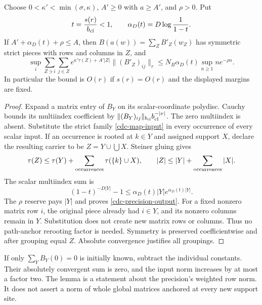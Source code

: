 \begin{lemma}
\label{cdc-precision-lemma}
Choose $0<\kappa'<\min(\sigma,\kappa)$, $A'\geq0$ with
$a\geq A'$, and $\rho>0$. Put
\begin{equation}
 t=\frac{s(r)}{b_{\rm cl}}<1,\qquad
 \alpha_D(t)=D\log\frac1{1-t}.
 \label{cdc-alpha}
\end{equation}
If $A'+\alpha_D(t)+\rho\leq A$, then
$B(a(w))=\sum_Z B'_Z(w_Z)$ has symmetric strict pieces with
rows and columns in $Z$, and
\begin{equation}
 \sup_i\sum_{Z\ni i}\sum_{j\in Z}
 e^{\kappa'\tau(Z)+A'|Z|}\|(B'_Z)_{ij}\|_r
 \leq N_B\alpha_D(t)
                   \sup_{n\geq1}n e^{-\rho n}.
 \label{cdc-precision-output}
\end{equation}
In particular the bound is $O(r)$ if $s(r)=O(r)$ and the
displayed margins are fixed.
\end{lemma}
\begin{proof}
Expand a matrix entry of $B_Y$ on its scalar-coordinate polydisc.
Cauchy bounds its multiindex coefficient by
$\|(B_Y)_{ij}\|_{b_{\rm cl}}b_{\rm cl}^{-|\nu|}$.
The zero multiindex is absent. Substitute the strict family
\eqref{cdc-map-input} in every occurrence of every scalar input.
If an occurrence is rooted at $k\in Y$ and assigned support $X$,
declare the resulting carrier to be
$Z=Y\cup\bigcup X$. Steiner gluing gives
\begin{equation}
 \tau(Z)\leq\tau(Y)+\sum_{\rm occurrences}
                            \tau(\{k\}\cup X),\qquad
 |Z|\leq|Y|+\sum_{\rm occurrences}|X|.
 \label{cdc-precision-gluing}
\end{equation}
The scalar multiindex sum is
\begin{equation}
 (1-t)^{-D|Y|}-1
 \leq\alpha_D(t)|Y|e^{\alpha_D(t)|Y|}.
 \label{cdc-precision-generating}
\end{equation}
The $\rho$ reserve pays $|Y|$ and proves
\eqref{cdc-precision-output}. For a fixed nonzero matrix row
$i$, the original piece already had $i\in Y$, and its nonzero
columns remain in $Y$. Substitution does not create new matrix
rows or columns. Thus no path-anchor rerooting factor is needed.
Symmetry is preserved coefficientwise and after grouping equal
$Z$. Absolute convergence justifies all groupings.
\end{proof}

If only $\sum_YB_Y(0)=0$ is initially known, subtract the
individual constants. Their absolutely convergent sum is zero,
and the input norm increases by at most a factor two. The lemma
is a statement about the precision's weighted row norm. It does
not assert a norm of whole global matrices anchored at every
new support site.

